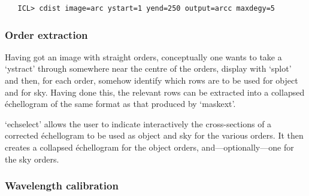 \documentclass[11pt,twoside]{article}
\newcommand{\latorhtm}[2]{#1}
\newcommand{\latorhtm}[2]{#2}
\begin{document}
\begin{verbatim}
   ICL> cdist image=arc ystart=1 yend=250 output=arcc maxdegy=5
\end{verbatim}


\subsubsection{Order extraction}

   Having got an image with straight orders, conceptually one wants to
   take a `ystract' through somewhere near the centre of the orders,
   display with `splot' and then, for each order, somehow identify which
   rows are to be used for object and for sky. Having done this, the
   relevant rows can be extracted into a collapsed \'echellogram of the
   same format as that produced by `maskext'.

   `echselect' allows the user to indicate interactively the
   cross-sections of a corrected \'echellogram to be used as object and
   sky for the various orders. It then creates a collapsed \'echellogram
   for the object orders, and\latorhtm{---}{-}optionally\latorhtm{---}{-}one
   for the sky orders.


\subsubsection{\label{techno13calib}Wavelength calibration}
\end{document}
